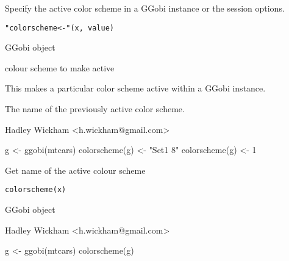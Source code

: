 \documentclass{article}
\begin{document}
\begin{Description}\relax
Specify the active color scheme in a GGobi instance or the  session options.
\end{Description}
\begin{Usage}
\begin{verbatim}"colorscheme<-"(x, value)\end{verbatim}
\end{Usage}
\begin{Arguments}
\begin{ldescription}
\item[\code{x}] GGobi object
\item[\code{value}] colour scheme to make active
\end{ldescription}
\end{Arguments}
\begin{Details}\relax
This makes a particular color scheme active within a GGobi instance.
\end{Details}
\begin{Value}
The name of the previously active color scheme.
\end{Value}
\begin{Author}\relax
Hadley Wickham <h.wickham@gmail.com>
\end{Author}
\begin{Examples}
\begin{ExampleCode}g <- ggobi(mtcars)
colorscheme(g) <- "Set1 8"
colorscheme(g) <- 1\end{ExampleCode}
\end{Examples}

\begin{Description}\relax
Get name of the active colour scheme
\end{Description}
\begin{Usage}
\begin{verbatim}colorscheme(x)\end{verbatim}
\end{Usage}
\begin{Arguments}
\begin{ldescription}
\item[\code{x}] GGobi object
\end{ldescription}
\end{Arguments}
\begin{Details}\relax
\end{Details}
\begin{Author}\relax
Hadley Wickham <h.wickham@gmail.com>
\end{Author}
\begin{Examples}
\begin{ExampleCode}g <- ggobi(mtcars)
colorscheme(g)\end{ExampleCode}
\end{Examples}
\end{document}
